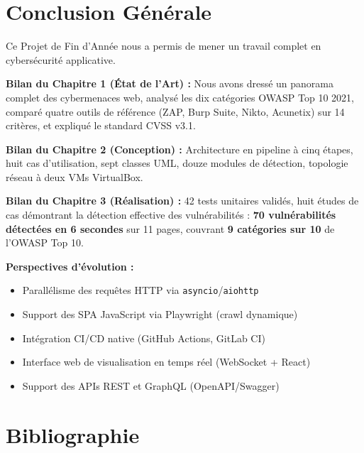 \documentclass[12pt,a4paper]{report}
\newcommand{\code}[1]{\texttt{#1}}
\begin{document}
\chapter*{Conclusion Générale}

Ce Projet de Fin d'Année nous a permis de mener un travail complet en cybersécurité applicative.

\textbf{Bilan du Chapitre 1 (État de l'Art) :} Nous avons dressé un panorama complet des
cybermenaces web, analysé les dix catégories OWASP Top 10 2021, comparé quatre outils de référence
(ZAP, Burp Suite, Nikto, Acunetix) sur 14 critères, et expliqué le standard CVSS v3.1.

\textbf{Bilan du Chapitre 2 (Conception) :} Architecture en pipeline à cinq étapes, huit cas
d'utilisation, sept classes UML, douze modules de détection, topologie réseau à deux VMs
VirtualBox.

\textbf{Bilan du Chapitre 3 (Réalisation) :} 42 tests unitaires validés, huit études de cas
démontrant la détection effective des vulnérabilités : \textbf{70 vulnérabilités détectées en
6 secondes} sur 11 pages, couvrant \textbf{9 catégories sur 10} de l'OWASP Top 10.

\textbf{Perspectives d'évolution :}
\begin{itemize}
  \item Parallélisme des requêtes HTTP via \code{asyncio}/\code{aiohttp}
  \item Support des SPA JavaScript via Playwright (crawl dynamique)
  \item Intégration CI/CD native (GitHub Actions, GitLab CI)
  \item Interface web de visualisation en temps réel (WebSocket + React)
  \item Support des APIs REST et GraphQL (OpenAPI/Swagger)
\end{itemize}

\chapter*{Bibliographie}
\end{document}
